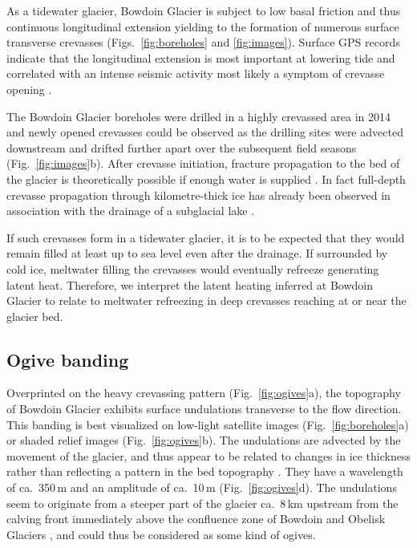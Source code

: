 \documentclass[utf8]{article}
\begin{document}
    As a tidewater glacier, Bowdoin Glacier is subject to low basal friction
    \citep{Seddik.etal.2019} and
    thus continuous longitudinal extension yielding to the formation of
    numerous surface transverse crevasses (Figs.~\ref{fig:boreholes} and
    \ref{fig:images}). Surface GPS records indicate that the longitudinal
    extension is most important at lowering tide and correlated with an intense
    seismic activity most likely a symptom of crevasse opening
    \citep{Podolskiy.etal.2016, Podolskiy.etal.2017}.

    The Bowdoin Glacier boreholes were drilled in a highly crevassed area in
    2014 and newly opened crevasses could be observed as the drilling sites
    were
    advected downstream and drifted further apart over the subsequent field
    seasons (Fig.~\ref{fig:images}b). After crevasse initiation, fracture
    propagation to the bed of the glacier is theoretically possible if enough
    water is supplied \citep{Veen.2007}. In fact full-depth crevasse
    propagation through kilometre-thick ice has already been observed in
    association with the drainage of a subglacial lake \citep{Das.etal.2008}.

    If such crevasses form in a tidewater glacier, it is to be expected that
    they would remain filled at least up to sea level even after the drainage.
    If surrounded by cold ice, meltwater filling the crevasses would eventually
    refreeze generating latent heat. Therefore, we interpret the latent heating
    inferred at Bowdoin Glacier to relate to meltwater refreezing in deep
    crevasses reaching at or near the glacier bed.


\subsection{Ogive banding}

    Overprinted on the heavy crevassing pattern (Fig.~\ref{fig:ogives}a), the
    topography of Bowdoin Glacier exhibits surface undulations transverse to
    the flow direction. This banding is best visualized on low-light satellite
    images (Fig.~\ref{fig:boreholes}a) or shaded relief images
    (Fig.~\ref{fig:ogives}b). The undulations are advected
    by the movement of the glacier, and thus appear to be related to changes in
    ice thickness rather than reflecting a pattern in the bed topography
    \citep[Fig.~\ref{fig:ogives}c;][Fig.~3]{Tsutaki.etal.2016}. They have a
    wavelength of ca.~350\,m and an amplitude of ca.~10\,m
    (Fig.~\ref{fig:ogives}d). The undulations seem to originate from a
    steeper part of the glacier ca.~8\,km upstream from the calving front
    immediately above the confluence zone of Bowdoin and Obelisk Glaciers
    \citep[Fig.~\ref{fig:images}a;][Fig.~3]{Tsutaki.etal.2016}, and
    could thus be considered as some kind of ogives.
\end{document}
